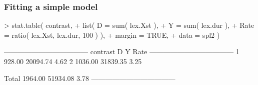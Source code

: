 
\begin{frame}[fragile]
  \frametitle{Fitting a simple model}
\begin{Schunk}
\begin{Sinput}
> stat.table( contrast,
+             list( D = sum( lex.Xst ),
+                   Y = sum( lex.dur ),
+                Rate = ratio( lex.Xst, lex.dur, 100 ) ),
+             margin = TRUE,
+             data = spl2 )
\end{Sinput}
\begin{Soutput}
 ------------------------------------ 
 contrast         D        Y    Rate  
 ------------------------------------ 
 1           928.00 20094.74    4.62  
 2          1036.00 31839.35    3.25  
                                      
 Total      1964.00 51934.08    3.78  
 ------------------------------------ 
\end{Soutput}
\end{Schunk}
\end{frame}


